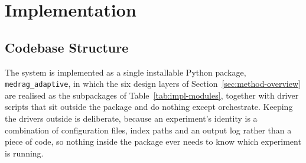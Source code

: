 \chapter{Implementation}
\label{ch:impl}

\section{Codebase Structure}
\label{sec:impl-structure}

The system is implemented as a single installable Python package,
\texttt{medrag\_adaptive}, in which the six design layers of
Section~\ref{sec:method-overview} are realised as the subpackages of
Table~\ref{tab:impl-modules}, together with driver scripts that sit outside
the package and do nothing except orchestrate. Keeping the drivers outside is
deliberate, because an experiment's identity is a combination of configuration
files, index paths and an output log rather than a piece of code, so nothing
inside the package ever needs to know which experiment is running.

